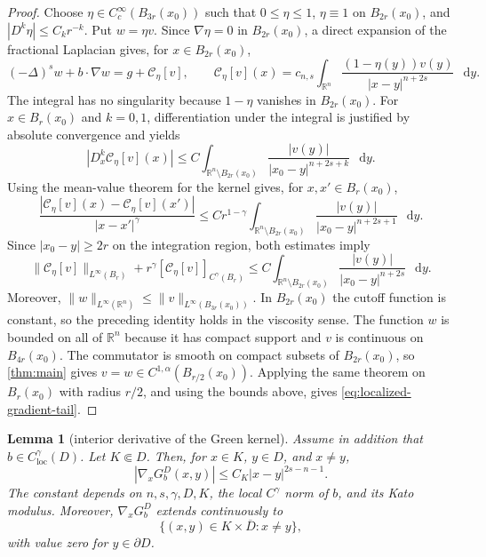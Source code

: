 \documentclass[10pt,a4paper]{amsart}
\numberwithin{equation}{section}
\newtheorem{lemma}[theorem]{Lemma}
\newcommand{\R}{\mathbb R}
\newcommand{\differential}{\mathop{}\!\mathrm d}
\newcommand{\rev}[1]{#1}
\begin{document}
\begin{proof}
Choose $\eta\in C_c^\infty(B_{3r}(x_0))$ such that
$0\le\eta\le1$, $\eta\equiv1$ on $B_{2r}(x_0)$, and
$|D^k\eta|\le C_kr^{-k}$.  Put $w=\eta v$.  Since $\nabla\eta=0$ in
$B_{2r}(x_0)$, a direct expansion of the fractional Laplacian gives, for
$x\in B_{2r}(x_0)$,
\[
 (-\Delta)^sw+b\cdot\nabla w
 =g+\mathcal C_\eta[v],
\qquad
 \mathcal C_\eta[v](x)
 =c_{n,s}\int_{\R^n}
 \frac{(1-\eta(y))v(y)}{|x-y|^{n+2s}}\,\differential y.
\]
The integral has no singularity because $1-\eta$ vanishes in
$B_{2r}(x_0)$.  For $x\in B_r(x_0)$ and $k=0,1$, differentiation under the
integral is justified by absolute convergence and yields
\[
 |D_x^k\mathcal C_\eta[v](x)|
 \le C\int_{\R^n\setminus B_{2r}(x_0)}
 \frac{|v(y)|}{|x_0-y|^{n+2s+k}}\,\differential y.
\]
Using the mean-value theorem for the kernel gives, for $x,x'\in B_r(x_0)$,
\[
 \frac{|\mathcal C_\eta[v](x)-\mathcal C_\eta[v](x')|}
 {|x-x'|^\gamma}
 \le Cr^{1-\gamma}
 \int_{\R^n\setminus B_{2r}(x_0)}
 \frac{|v(y)|}{|x_0-y|^{n+2s+1}}\,\differential y.
\]
Since $|x_0-y|\ge2r$ on the integration region, both estimates imply
\[
 \|\mathcal C_\eta[v]\|_{L^\infty(B_r)}
 +r^\gamma[\mathcal C_\eta[v]]_{C^\gamma(B_r)}
 \le C\int_{\R^n\setminus B_{2r}(x_0)}
 \frac{|v(y)|}{|x_0-y|^{n+2s}}\,\differential y.
\]
Moreover,
$\|w\|_{L^\infty(\R^n)}\le\|v\|_{L^\infty(B_{3r}(x_0))}$.
In $B_{2r}(x_0)$ the cutoff function is constant, so the preceding identity
holds in the viscosity sense.  The function $w$ is bounded on all of $\R^n$
because it has compact support and $v$ is continuous on $B_{4r}(x_0)$.
\rev{The commutator is smooth on compact subsets of $B_{2r}(x_0)$, so
\cref{thm:main} gives $v=w\in C^{1,\alpha}(B_{r/2}(x_0))$.  Applying the
same theorem on $B_r(x_0)$ with radius $r/2$, and using the bounds above,
gives \eqref{eq:localized-gradient-tail}.}
\end{proof}

\begin{lemma}[interior derivative of the Green kernel]
\label{lem:green-gradient}
Assume in addition that $b\in C^\gamma_{\mathrm{loc}}(D)$.  Let
$K\Subset D$.  Then, for $x\in K$, $y\in D$, and $x\ne y$,
\begin{equation}\label{eq:green-gradient}
 |\nabla_xG_b^D(x,y)|
 \le C_K |x-y|^{2s-n-1}.
\end{equation}
The constant depends on $n,s,\gamma,D,K$, the local $C^\gamma$ norm of $b$,
and its Kato modulus.
\rev{Moreover, $\nabla_xG_b^D$ extends continuously to
\[
 \{(x,y)\in K\times\overline D:x\ne y\},
\]
with value zero for $y\in\partial D$.}
\end{lemma}
\end{document}
